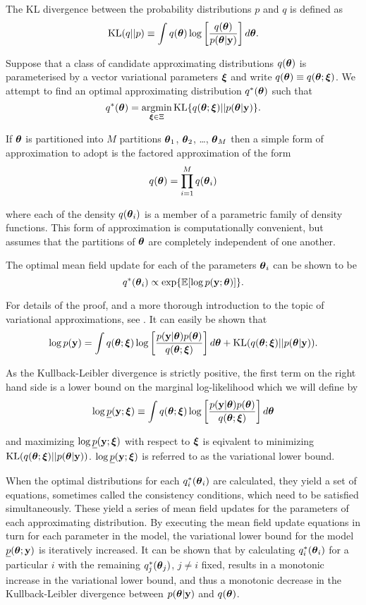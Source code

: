 The KL divergence between the probability distributions $p$ and $q$ is defined
as
$$
	\text{KL}(q || p) \equiv \int q({\boldsymbol \theta}) \log \left [ \frac{q({\boldsymbol \theta})}{p({\boldsymbol \theta} | {\bf y})} \right ] d {\boldsymbol \theta}.
$$

Suppose that a class of candidate approximating distributions $q({\boldsymbol \theta})$ is
parameterised by a vector variational parameters ${\boldsymbol \xi}$ and write
$q({\boldsymbol \theta})\equiv q({\boldsymbol \theta};{\boldsymbol \xi})$. We attempt to find an  optimal approximating
distribution $q^*({\boldsymbol \theta})$ such that
$$
	\ds q^*(\vtheta) = \argmin_{\vxi \in \Xi} \text{KL} \{ {q(\vtheta;\vxi) || p(\vtheta|\vy)} \}.
$$

\noindent If ${\boldsymbol \theta}$ is partitioned into $M$ partitions ${\boldsymbol \theta}_1$,
${\boldsymbol \theta}_2$, \ldots, ${\boldsymbol \theta}_M$ then a simple form of approximation to adopt is
the factored approximation of the form
$$
	q({\boldsymbol \theta}) = \prod_{i=1}^M q({\boldsymbol \theta}_i)
$$

\noindent where each of the density $q({\boldsymbol \theta}_i)$ is a member of a parametric
family of density functions.  This form of approximation is computationally
convenient, but assumes that the partitions of ${\boldsymbol \theta}$ are completely
independent of one another.

The optimal mean field update for each of the parameters ${\boldsymbol \theta}_i$ can be
shown to be
$$
	q^*({\boldsymbol \theta}_i) \propto \exp \{ \mathbb{E} [\log p({\bf y}; {\boldsymbol \theta})] \}.
$$

\noindent For details of the proof, and a more thorough introduction to the
topic of variational approximations, see \cite{Ormerod2010}. It can easily be
shown that
$$
	\displaystyle \log p({\bf y}) = \int q({\boldsymbol \theta};{\boldsymbol \xi}) \log \left[ \frac{p({\bf y}|{\boldsymbol \theta})p({\boldsymbol \theta})}{q({\boldsymbol \theta};{\boldsymbol \xi})} \right] d{\boldsymbol \theta} + \text{KL}(q({\boldsymbol \theta};{\boldsymbol \xi})||p({\boldsymbol \theta}|{\bf y})).
$$

\noindent As the Kullback-Leibler divergence is strictly positive, the first
term on the right hand side is a lower bound on the marginal log-likelihood
which we will define by
$$
	\displaystyle \log \underline{p}({\bf y};{\boldsymbol \xi}) \equiv \int q({\boldsymbol \theta};{\boldsymbol \xi})  \log \left[ \frac{p({\bf y}|{\boldsymbol \theta})p({\boldsymbol \theta})}{q({\boldsymbol \theta};{\boldsymbol \xi})} \right] d{\boldsymbol \theta}
$$

\noindent and maximizing $\log \underline{p}({\bf y};{\boldsymbol \xi})$ with respect to ${\boldsymbol \xi}$
is eqivalent to minimizing $\text{KL}(q({\boldsymbol \theta};{\boldsymbol \xi})||p({\boldsymbol \theta}|{\bf y}))$. $\log
\underline{p}({\bf y};{\boldsymbol \xi})$ is referred to as the variational lower bound.

When the optimal distributions for each $q_i^*({\boldsymbol \theta}_i)$ are calculated, they
yield a set of equations, sometimes called the consistency conditions, which
need to be  satisfied simultaneously. These yield a series of mean field updates
for the parameters of each approximating distribution. By executing the mean
field update equations in turn for each parameter in the model, the variational
lower bound for the model $\underline{p}({\boldsymbol \theta}; {\bf y})$ is iteratively
increased. It can be shown that by calculating $q_i^*({\boldsymbol \theta}_i)$ for  a
particular $i$ with the remaining $q_j^*({\boldsymbol \theta}_j)$, $j\ne i$ fixed, results in
a monotonic increase in the variational lower bound, and thus a monotonic
decrease in the Kullback-Leibler divergence between $p({\boldsymbol \theta}|{\bf y})$ and
$q({\boldsymbol \theta})$.

